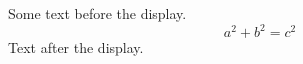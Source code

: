 \documentclass[12pt]{article}
\begin{document}
Some text before the display.
\begin{equation*} a^2 + b^2 = c^2 \end{equation*}
Text after the display.
\end{document}
